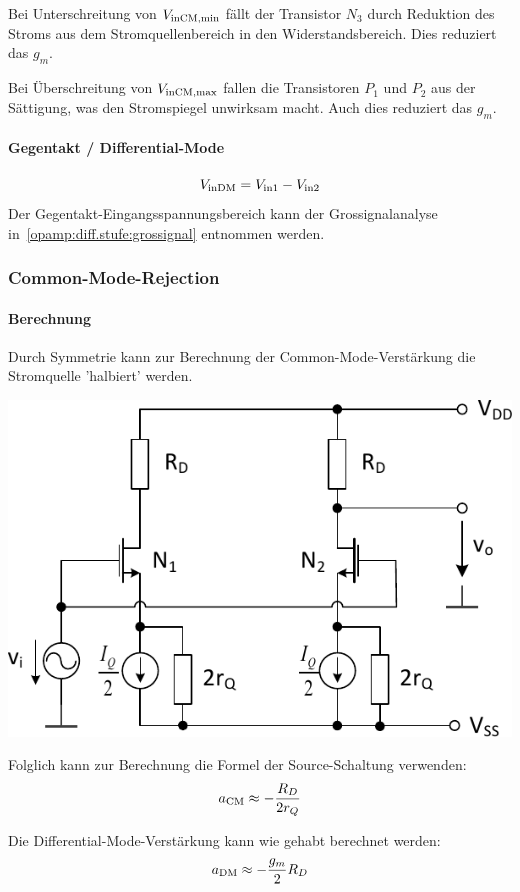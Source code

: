 \smallskip

Bei Unterschreitung von $V_{\rm inCM, min}$ fällt der Transistor $N_3$ durch Reduktion des Stroms aus dem Stromquellenbereich in den Widerstandsbereich. Dies reduziert das $g_m$.

Bei Überschreitung von $V_{\rm inCM, max}$ fallen die Transistoren $P_1$ und $P_2$ aus der Sättigung, was den Stromspiegel unwirksam macht. Auch dies reduziert das $g_m$.


\paragraph{Gegentakt / Differential-Mode}
\[
    V_{\rm inDM} = V_{\rm in1} - V_{\rm in2}
\]
Der Gegentakt-Eingangsspannungsbereich kann der Grossignalanalyse in~\ref{opamp:diff.stufe:grossignal} entnommen werden.


\subsubsection{Common-Mode-Rejection}
\paragraph{Berechnung}

Durch Symmetrie kann zur Berechnung der Common-Mode-Verstärkung die Stromquelle 'halbiert' werden.

\begin{minipage}[t]{0.48\columnwidth}
    \includegraphics[width=\columnwidth, align=t]{images/09_common_mode_rejection.pdf}
\end{minipage}
\hfill
\begin{minipage}[t]{0.48\columnwidth}
    Folglich kann zur Berechnung die Formel der Source-Schaltung verwenden:
    \[
        a_{\rm CM} \approx - \frac{R_D}{2 r_Q}
    \]

    Die Differential-Mode-Verstärkung kann wie gehabt berechnet werden:
    \[
        a_{\rm DM} \approx -\frac{g_m}{2} R_D
\]
\end{minipage}



